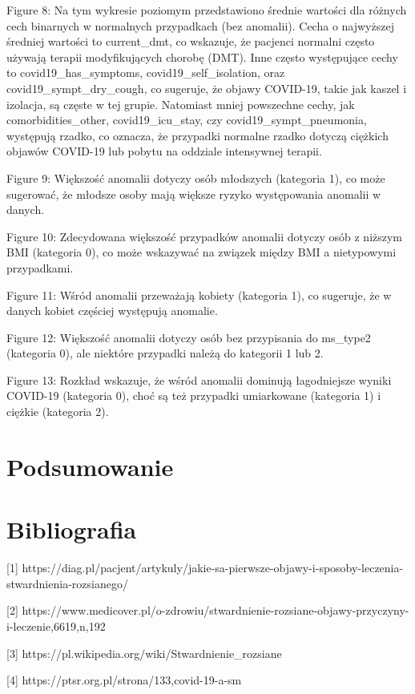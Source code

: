 \documentclass[a4paper,fleqn]{cas-dc}
\begin{document}
Figure 8: Na tym wykresie poziomym przedstawiono średnie wartości dla różnych cech binarnych w normalnych przypadkach (bez anomalii). Cecha o najwyższej średniej wartości to current\_dmt, co wskazuje, że pacjenci normalni często używają terapii modyfikujących chorobę (DMT). Inne często występujące cechy to covid19\_has\_symptoms, covid19\_self\_isolation, oraz covid19\_sympt\_dry\_cough, co sugeruje, że objawy COVID-19, takie jak kaszel i izolacja, są częste w tej grupie. Natomiast mniej powszechne cechy, jak comorbidities\_other, covid19\_icu\_stay, czy covid19\_sympt\_pneumonia, występują rzadko, co oznacza, że przypadki normalne rzadko dotyczą ciężkich objawów COVID-19 lub pobytu na oddziale intensywnej terapii.

Figure 9: Większość anomalii dotyczy osób młodszych (kategoria 1), co może sugerować, że młodsze osoby mają większe ryzyko występowania anomalii w danych.

Figure 10: Zdecydowana większość przypadków anomalii dotyczy osób z niższym BMI (kategoria 0), co może wskazywać na związek między BMI a nietypowymi przypadkami.

Figure 11: Wśród anomalii przeważają kobiety (kategoria 1), co sugeruje, że w danych kobiet częściej występują anomalie.

Figure 12: Większość anomalii dotyczy osób bez przypisania do ms\_type2 (kategoria 0), ale niektóre przypadki należą do kategorii 1 lub 2.

Figure 13: Rozkład wskazuje, że wśród anomalii dominują łagodniejsze wyniki COVID-19 (kategoria 0), choć są też przypadki umiarkowane (kategoria 1) i ciężkie (kategoria 2).

\section{Podsumowanie}


\section{Bibliografia}

[1] https://diag.pl/pacjent/artykuly/jakie-sa-pierwsze-objawy-i-sposoby-leczenia-stwardnienia-rozsianego/

[2] https://www.medicover.pl/o-zdrowiu/stwardnienie-rozsiane-objawy-przyczyny-i-leczenie,6619,n,192

[3] https://pl.wikipedia.org/wiki/Stwardnienie\_rozsiane

[4] https://ptsr.org.pl/strona/133,covid-19-a-sm
\end{document}
